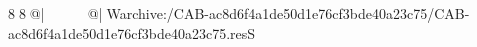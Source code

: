 8  8  @|                                                   @| W   archive:/CAB-ac8d6f4a1de50d1e76cf3bde40a23c75/CAB-ac8d6f4a1de50d1e76cf3bde40a23c75.resS 